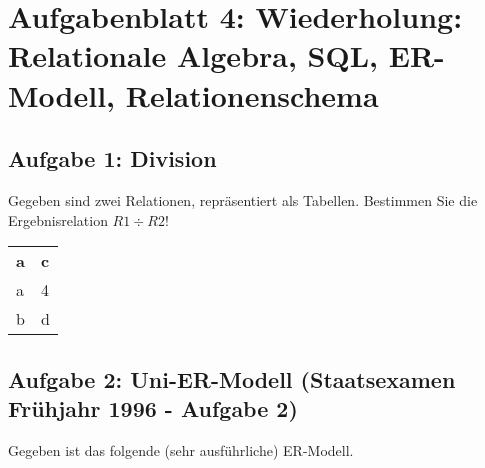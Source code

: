 \documentclass{lehramt-informatik}
\begin{document}
\chapter{Aufgabenblatt 4: Wiederholung: Relationale Algebra, SQL, ER-Modell, Relationenschema}

%

\section{Aufgabe 1: Division}

Gegeben sind zwei Relationen, repräsentiert als Tabellen. Bestimmen Sie
die Ergebnisrelation $R1 \div R2$!

\begin{antwort}
\begin{tabular}{ll}
\textbf{a} & \textbf{c} \\
a & 4 \\
b & d
\end{tabular}
\end{antwort}

%

\section{Aufgabe 2: Uni-ER-Modell (Staatsexamen Frühjahr 1996 -
Aufgabe 2)}

Gegeben ist das folgende (sehr ausführliche) ER-Modell.
\end{document}
